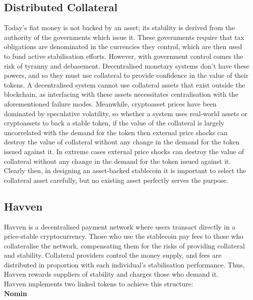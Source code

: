 \subsection{Distributed Collateral}

\noindent Today’s fiat money is not backed by an asset; its stability is derived from the authority of the governments which issue it. These governments require that tax obligations are denominated in the currencies they control, which are then used to fund active stabilisation efforts. However, with government control comes the risk of tyranny and debasement. Decentralised monetary systems don’t have these powers, and so they must use collateral to provide confidence in the value of their tokens. A decentralised system cannot use collateral assets that exist outside the blockchain, as interfacing with these assets necessitates centralisation with the aforementioned failure modes. Meanwhile, cryptoasset prices have been dominated by speculative volatility, so whether a system uses real-world assets or cryptoassets to back a stable token, if the value of the collateral is largely uncorrelated with the demand for the token then external price shocks can destroy the value of collateral without any change in the demand for the token issued against it. In extreme cases external price shocks can destroy the value of collateral without any change in the demand for the token issued against it. Clearly then, in designing an asset-backed stablecoin it is important to select the collateral asset carefully, but no existing asset perfectly serves the purpose.

\subsection{Havven}

\noindent Havven is a decentralised payment network where users transact directly in a price-stable cryptocurrency. Those who use the stablecoin pay fees to those who collateralise the network, compensating them for the risks of providing collateral and stability. Collateral providers control the money supply, and fees are distributed in proportion with each individual’s stabilisation performance. Thus, Havven rewards suppliers of stability and charges those who demand it. \\

\noindent Havven implements two linked tokens to achieve this structure: \\

\noindent \textbf{Nomin}

